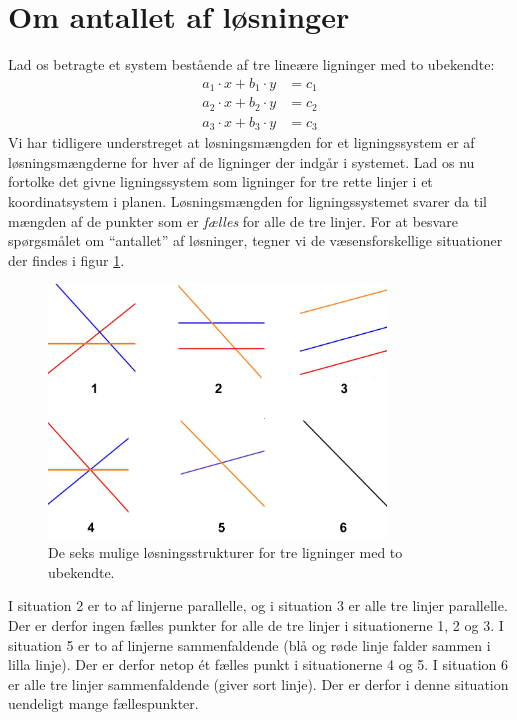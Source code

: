 \section{Om antallet af løsninger}
Lad os betragte et system bestående af tre lineære ligninger med to ubekendte:
\begin{equation}
\begin{aligned}
a_1\cdot x + b_1\cdot y &= c_1\\
a_2\cdot x + b_2\cdot y &= c_2\\
a_3\cdot x + b_3\cdot y &= c_3
\end{aligned}
\end{equation}
Vi har tidligere understreget at løsningsmængden for et ligningssystem er  af løsningsmængderne for hver af de ligninger der indgår i systemet. Lad os nu fortolke det givne ligningssystem som ligninger for tre rette linjer i et koordinatsystem i planen. Løsningsmængden for ligningssystemet svarer da til mængden af de punkter som er \textit{fælles} for alle de tre linjer. For at besvare spørgsmålet om ``antallet'' af løsninger, tegner vi de væsensforskellige situationer der findes i figur \ref{tn2.figloes}.
\begin{figure}[hbt]
\centering
		\includegraphics[width=0.8\textwidth]{6stregerien.png}
	\caption{De seks mulige løsningsstrukturer for tre ligninger med to ubekendte.} \label{tn2.figloes}
\end{figure}
I situation 2 er to af linjerne parallelle, og i situation 3 er alle tre linjer parallelle. Der er derfor ingen fælles punkter for alle de tre linjer i situationerne 1, 2 og 3. I situation 5 er to af linjerne sammenfaldende (blå og røde linje falder sammen i lilla linje). Der er derfor netop ét fælles punkt i situationerne 4 og 5. I situation 6 er alle tre linjer sammenfaldende (giver sort linje). Der er derfor i denne situation uendeligt mange fællespunkter.\\

